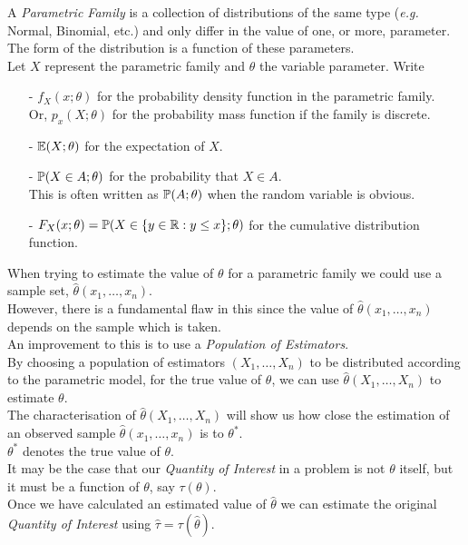 \documentclass[11pt,a4paper]{article}
\begin{document}
A \textit{Parametric Family} is a collection of distributions of the same type (\textit{e.g.} Normal, Binomial, etc.) and only differ in the value of one, or more, parameter.\\
\nb The form of the distribution is a function of these parameters.\\

Let $X$ represent the parametric family and $\theta$ the variable parameter. Write
\begin{itemize}
	\item[-] $f_X(x;\theta)$ for the probability density function in the parametric family.\\
	Or, $p_x(X;\theta)$ for the probability mass function if the family is discrete.
	\item[-] $\mathbb{E}(X;\theta)$ for the expectation of $X$.
	\item[-] $\mathbb{P}(X\in A;\theta)$ for the probability that $X\in A$.\\
	\nb This is often written as $\mathbb{P}(A;\theta)$ when the random variable is obvious.
	\item[-] $F_X(x;\theta)=\mathbb{P}(X\in\{y\in\mathbb{R}:y\leq x\};\theta)$ for the cumulative distribution function.
\end{itemize}

When trying to estimate the value of $\theta$ for a parametric family we could use a sample set, $\hat{\theta}(x_1,\dots,x_n)$.\\
However, there is a fundamental flaw in this since the value of $\hat{\theta}(x_1,\dots,x_n)$ depends on the sample which is taken.\\
An improvement to this is to use a \textit{Population of Estimators}.\\

By choosing a population of estimators $(X_1,\dots,X_n)$ to be distributed according to the parametric model, for the true value of $\theta$, we can use $\hat{\theta}(X_1,\dots,X_n)$ to estimate $\theta$.\\
The characterisation of $\hat{\theta}(X_1,\dots,X_n)$ will show us how close the estimation of an observed sample $\hat{\theta}(x_1,\dots,x_n)$ is to $\theta^*$.\\
\nb $\theta^*$ denotes the true value of $\theta$.\\

It may be the case that our \textit{Quantity of Interest} in a problem is not $\theta$ itself, but it must be a function of $\theta$, say $\tau(\theta)$.\\
Once we have calculated an estimated value of $\hat{\theta}$ we can estimate the original \textit{Quantity of Interest} using $\hat{\tau}=\tau(\hat{\theta})$.\\
\end{document}
